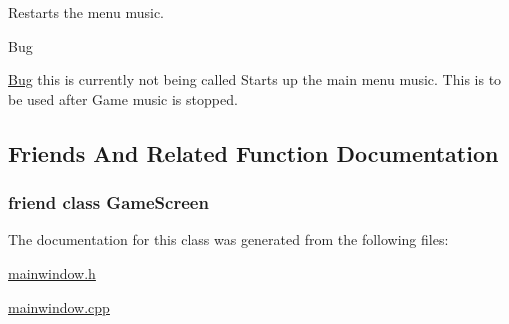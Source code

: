 Restarts the menu music. 

\begin{DoxyRefDesc}{Bug}
\item[\hyperlink{bug__bug000002}{Bug}]this is currently not being called Starts up the main menu music. This is to be used after Game music is stopped. \end{DoxyRefDesc}


\subsection{Friends And Related Function Documentation}
\hypertarget{class_main_window_a56592566d22f2b39f7d090a5001d3988}{
\subsubsection[{Game\-Screen}]{\setlength{\rightskip}{0pt plus 5cm}friend class {\bf Game\-Screen}\hspace{0.3cm}{\ttfamily [friend]}}}\label{class_main_window_a56592566d22f2b39f7d090a5001d3988}


The documentation for this class was generated from the following files\-:\begin{DoxyCompactItemize}
\item 
\hyperlink{mainwindow_8h}{mainwindow.\-h}\item 
\hyperlink{mainwindow_8cpp}{mainwindow.\-cpp}\end{DoxyCompactItemize}
